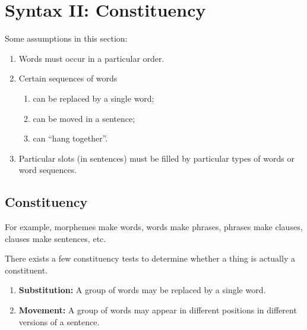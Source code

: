 \documentclass[../main.tex]{subfiles}
\begin{document}
	\section{Syntax II: Constituency}
		\begin{preamb}
			Some assumptions in this section: \begin{enumerate}
				\item Words must occur in a particular order.
				\item Certain sequences of words \begin{enumerate}
					\item can be replaced by a single word;
					\item can be moved in a sentence;
					\item can ``hang together''.
				\end{enumerate}
				\item Particular slots (in sentences) must be filled by particular types of words or word sequences.
			\end{enumerate}
		\end{preamb}
		\subsection{Constituency}
		For example, morphemes make words, words make phrases, phrases make clauses, clauses make sentences, etc.

		There exists a few constituency tests to determine whether a thing is actually a constituent.
		\begin{enumerate}
			\item \textbf{Substitution:} A group of words may be replaced by a single word.
			\item \textbf{Movement:} A group of words may appear in different positions in different versions of a sentence.
		\end{enumerate}
\end{document}
